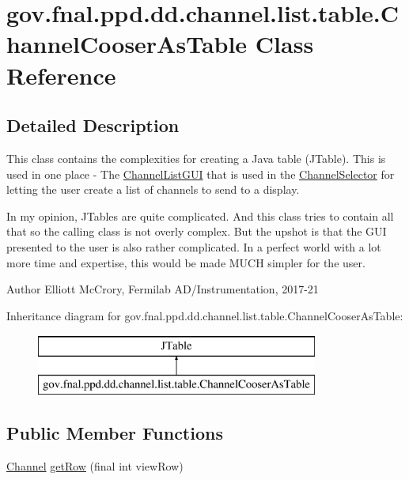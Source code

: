 \hypertarget{classgov_1_1fnal_1_1ppd_1_1dd_1_1channel_1_1list_1_1table_1_1ChannelCooserAsTable}{\section{gov.\-fnal.\-ppd.\-dd.\-channel.\-list.\-table.\-Channel\-Cooser\-As\-Table Class Reference}
\label{classgov_1_1fnal_1_1ppd_1_1dd_1_1channel_1_1list_1_1table_1_1ChannelCooserAsTable}
}


\subsection{Detailed Description}
This class contains the complexities for creating a Java table (J\-Table). This is used in one place -\/ The \hyperlink{classgov_1_1fnal_1_1ppd_1_1dd_1_1channel_1_1list_1_1ChannelListGUI}{Channel\-List\-G\-U\-I} that is used in the \hyperlink{classgov_1_1fnal_1_1ppd_1_1dd_1_1ChannelSelector}{Channel\-Selector} for letting the user create a list of channels to send to a display.

In my opinion, J\-Tables are quite complicated. And this class tries to contain all that so the calling class is not overly complex. But the upshot is that the G\-U\-I presented to the user is also rather complicated. In a perfect world with a lot more time and expertise, this would be made M\-U\-C\-H simpler for the user.

\begin{DoxyAuthor}{Author}
Elliott Mc\-Crory, Fermilab A\-D/\-Instrumentation, 2017-\/21 
\end{DoxyAuthor}
Inheritance diagram for gov.\-fnal.\-ppd.\-dd.\-channel.\-list.\-table.\-Channel\-Cooser\-As\-Table\-:\begin{figure}[H]
\begin{center}
\leavevmode
\includegraphics[height=2.000000cm]{classgov_1_1fnal_1_1ppd_1_1dd_1_1channel_1_1list_1_1table_1_1ChannelCooserAsTable}
\end{center}
\end{figure}
\subsection*{Public Member Functions}
\begin{DoxyCompactItemize}
\item 
\hyperlink{interfacegov_1_1fnal_1_1ppd_1_1dd_1_1signage_1_1Channel}{Channel} \hyperlink{classgov_1_1fnal_1_1ppd_1_1dd_1_1channel_1_1list_1_1table_1_1ChannelCooserAsTable_acb5af42a57b27a5bffd85fd6e3a3dbcf}{get\-Row} (final int view\-Row)
\end{DoxyCompactItemize}


